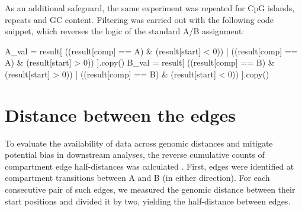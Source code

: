 \documentclass[
  a4paper,
  openany]{scrbook}
\newenvironment{Shaded}{\begin{snugshade}}{\end{snugshade}}
\newcommand{\DecValTok}[1]{\textcolor[rgb]{0.69,0.50,0.00}{#1}}
\newcommand{\NormalTok}[1]{\textcolor[rgb]{0.12,0.11,0.11}{#1}}
\newcommand{\OperatorTok}[1]{\textcolor[rgb]{0.12,0.11,0.11}{#1}}
\newcommand{\StringTok}[1]{\textcolor[rgb]{0.75,0.01,0.01}{#1}}
\begin{document}
As an additional safeguard, the same experiment was repeated for CpG
islands, repeats and GC content. Filtering was carried out with the
following code snippet, which reverses the logic of the standard A/B
assignment:

\begin{Shaded}
\begin{Highlighting}[]
\NormalTok{    A\_val }\OperatorTok{=}\NormalTok{ result[}
\NormalTok{        ((result[}\StringTok{\textquotesingle{}comp\textquotesingle{}}\NormalTok{] }\OperatorTok{==} \StringTok{\textquotesingle{}A\textquotesingle{}}\NormalTok{) }\OperatorTok{\&}\NormalTok{ (result[}\StringTok{\textquotesingle{}start\textquotesingle{}}\NormalTok{] }\OperatorTok{\textless{}} \DecValTok{0}\NormalTok{)) }\OperatorTok{|}
\NormalTok{        ((result[}\StringTok{\textquotesingle{}comp\textquotesingle{}}\NormalTok{] }\OperatorTok{==} \StringTok{\textquotesingle{}A\textquotesingle{}}\NormalTok{) }\OperatorTok{\&}\NormalTok{ (result[}\StringTok{\textquotesingle{}start\textquotesingle{}}\NormalTok{] }\OperatorTok{\textgreater{}} \DecValTok{0}\NormalTok{))}
\NormalTok{    ].copy()}
\NormalTok{    B\_val }\OperatorTok{=}\NormalTok{ result[}
\NormalTok{        ((result[}\StringTok{\textquotesingle{}comp\textquotesingle{}}\NormalTok{] }\OperatorTok{==} \StringTok{\textquotesingle{}B\textquotesingle{}}\NormalTok{) }\OperatorTok{\&}\NormalTok{ (result[}\StringTok{\textquotesingle{}start\textquotesingle{}}\NormalTok{] }\OperatorTok{\textgreater{}} \DecValTok{0}\NormalTok{)) }\OperatorTok{|}
\NormalTok{        ((result[}\StringTok{\textquotesingle{}comp\textquotesingle{}}\NormalTok{] }\OperatorTok{==} \StringTok{\textquotesingle{}B\textquotesingle{}}\NormalTok{) }\OperatorTok{\&}\NormalTok{ (result[}\StringTok{\textquotesingle{}start\textquotesingle{}}\NormalTok{] }\OperatorTok{\textless{}} \DecValTok{0}\NormalTok{))}
\NormalTok{    ].copy()}
\end{Highlighting}
\end{Shaded}

\section{Distance between the edges}\label{distance-between-the-edges}

To evaluate the availability of data across genomic distances and
mitigate potential bias in downstream analyses, the reverse cumulative
counts of compartment edge half-distances was calculated . First, edges
were identified at compartment transitions between A and B (in either
direction). For each consecutive pair of such edges, we measured the
genomic distance between their start positions and divided it by two,
yielding the half-distance between edges.
\end{document}

